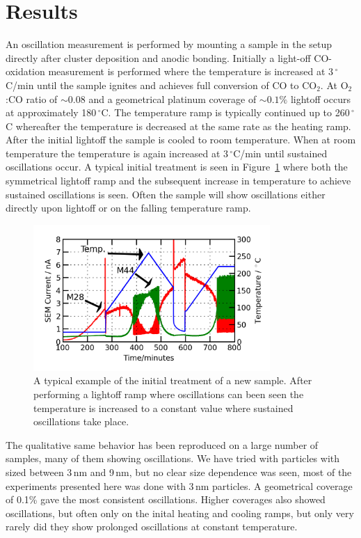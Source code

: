 \documentclass[8.5pt,twoside,twocolumn]{article}
\begin{document}
\section{Results}
An oscillation measurement is performed by mounting a sample in the setup directly after cluster deposition and anodic bonding. Initially a light-off CO-oxidation measurement is performed where the temperature is increased at 3\,$^\circ$C/min until the sample ignites and achieves full conversion of CO to CO$_2$. At O$_2$:CO ratio of $\sim0.08$ and a geometrical platinum coverage of $\sim0.1\%$ lightoff occurs at approximately 180\,$^\circ$C. The temperature ramp is typically continued up to 260\,$^\circ$C whereafter the temperature is decreased at the same rate as the heating ramp. After the initial lightoff the sample is cooled to room temperature. When at room temperature the temperature is again increased at 3\,$^\circ$C/min until sustained oscillations occur. A typical initial treatment is seen in Figure~\ref{fgr:initial_treatment} where both the symmetrical lightoff ramp and the subsequent increase in temperature to achieve sustained oscillations is seen. Often the sample will show oscillations either directly upon lightoff or on the falling temperature ramp.
\begin{figure}[h]
\centering
  \includegraphics[width=9cm]{initial_treatment.png}
  \caption{A typical example of the initial treatment of a new sample. After performing a lightoff ramp where oscillations can been seen the temperature is increased to a constant value where sustained oscillations take place.}
  \label{fgr:initial_treatment}
\end{figure}
The qualitative same behavior has been reproduced on a large number of samples, many of them showing oscillations. We have tried with particles with sized between 3\,nm and 9\,nm, but no clear size dependence was seen, most of the experiments presented here was done with 3\,nm particles. A geometrical coverage of 0.1\% gave the most consistent oscillations. Higher coverages also showed oscillations, but often only on the inital heating and cooling ramps, but only very rarely did they show prolonged oscillations at constant temperature.
\end{document}
